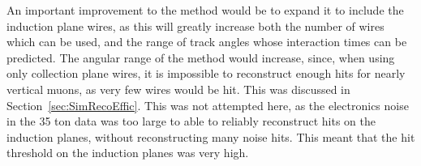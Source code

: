 
An important improvement to the method would be to expand it to include the induction plane wires, as this will greatly increase both the number of wires which can be used, and the range of track angles whose interaction times can be predicted. The angular range of the method would increase, since, when using only collection plane wires, it is impossible to reconstruct enough hits for nearly vertical muons, as very few wires would be hit. This was discussed in Section~\ref{sec:SimRecoEffic}. This was not attempted here, as the electronics noise in the 35 ton data was too large to able to reliably reconstruct hits on the induction planes, without reconstructing many noise hits. This meant that the hit threshold on the induction planes was very high. \\
